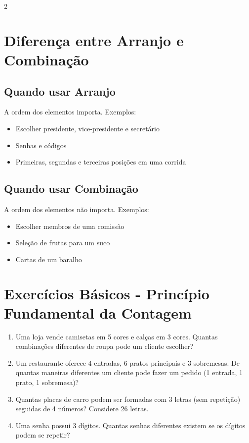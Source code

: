 \documentclass[11pt]{article}
\begin{document}
\begin{multicols}{2}
\section*{Diferença entre Arranjo e Combinação}

\subsection*{Quando usar Arranjo}
A ordem dos elementos importa. Exemplos:
\begin{itemize}
\item Escolher presidente, vice-presidente e secretário
\item Senhas e códigos
\item Primeiras, segundas e terceiras posições em uma corrida
\end{itemize}

\subsection*{Quando usar Combinação}
A ordem dos elementos não importa. Exemplos:
\begin{itemize}
\item Escolher membros de uma comissão
\item Seleção de frutas para um suco
\item Cartas de um baralho
\end{itemize}

\section*{Exercícios Básicos - Princípio Fundamental da Contagem}

\begin{enumerate}[leftmargin=*]

\item Uma loja vende camisetas em 5 cores e calças em 3 cores. Quantas combinações diferentes de roupa pode um cliente escolher?

\item Um restaurante oferece 4 entradas, 6 pratos principais e 3 sobremesas. De quantas maneiras diferentes um cliente pode fazer um pedido (1 entrada, 1 prato, 1 sobremesa)?

\item Quantas placas de carro podem ser formadas com 3 letras (sem repetição) seguidas de 4 números? Considere 26 letras.

\item Uma senha possui 3 dígitos. Quantas senhas diferentes existem se os dígitos podem se repetir?


\end{enumerate}
\end{multicols}
\end{document}
